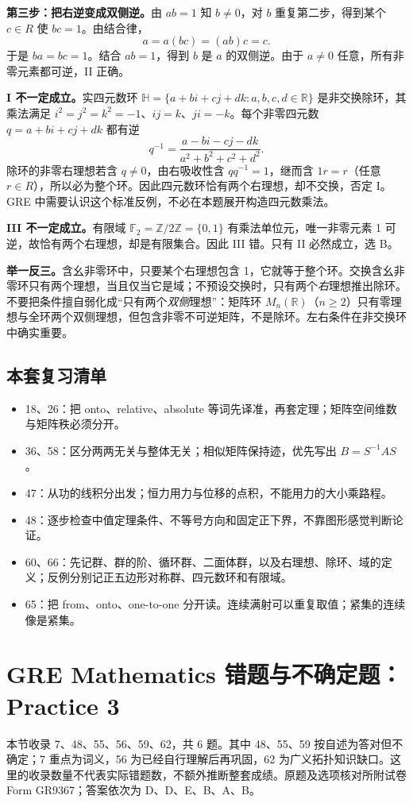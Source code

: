 \documentclass[11pt,a4paper,fontset=fandol]{ctexart}
\begin{document}
\textbf{第三步：把右逆变成双侧逆。}由 $ab=1$ 知 $b\ne0$，对 $b$ 重复第二步，得到某个 $c\in R$ 使 $bc=1$。由结合律，
\[
a=a(bc)=(ab)c=c.
\]
于是 $ba=bc=1$。结合 $ab=1$，得到 $b$ 是 $a$ 的双侧逆。由于 $a\ne0$ 任意，所有非零元素都可逆，II 正确。

\textbf{I 不一定成立。}实四元数环 $\mathbb H=\{a+bi+cj+dk:a,b,c,d\in\mathbb R\}$ 是非交换除环，其乘法满足 $i^2=j^2=k^2=-1$、$ij=k$、$ji=-k$。每个非零四元数 $q=a+bi+cj+dk$ 都有逆
\[
q^{-1}=\frac{a-bi-cj-dk}{a^2+b^2+c^2+d^2}.
\]
除环的非零右理想若含 $q\ne0$，由右吸收性含 $qq^{-1}=1$，继而含 $1r=r$（任意 $r\in R$），所以必为整个环。因此四元数环恰有两个右理想，却不交换，否定 I。GRE 中需要认识这个标准反例，不必在本题展开构造四元数乘法。

\textbf{III 不一定成立。}有限域 $\mathbb F_2=\mathbb Z/2\mathbb Z=\{0,1\}$ 有乘法单位元，唯一非零元素 1 可逆，故恰有两个右理想，却是有限集合。因此 III 错。只有 II 必然成立，选 B。

\textbf{举一反三。}含幺非零环中，只要某个右理想包含 1，它就等于整个环。交换含幺非零环只有两个理想，当且仅当它是域；不预设交换时，只有两个\emph{右}理想推出除环。不要把条件擅自弱化成“只有两个\emph{双侧}理想”：矩阵环 $M_n(\mathbb R)$（$n\ge2$）只有零理想与全环两个双侧理想，但包含非零不可逆矩阵，不是除环。左右条件在非交换环中确实重要。

\subsection{本套复习清单}
\begin{itemize}
\item 18、26：把 onto、relative、absolute 等词先译准，再套定理；矩阵空间维数与矩阵秩必须分开。
\item 36、58：区分两两无关与整体无关；相似矩阵保持迹，优先写出 $B=S^{-1}AS$。
\item 47：从功的线积分出发；恒力用力与位移的点积，不能用力的大小乘路程。
\item 48：逐步检查中值定理条件、不等号方向和固定正下界，不靠图形感觉判断论证。
\item 60、66：先记群、群的阶、循环群、二面体群，以及右理想、除环、域的定义；反例分别记正五边形对称群、四元数环和有限域。
\item 65：把 from、onto、one-to-one 分开读。连续满射可以重复取值；紧集的连续像是紧集。
\end{itemize}
\clearpage
\section{GRE Mathematics 错题与不确定题：Practice 3}
本节收录 7、48、55、56、59、62，共 6 题。其中 48、55、59 按自述为答对但不确定；7 重点为词义，56 为已经自行理解后再巩固，62 为广义拓扑知识缺口。这里的收录数量不代表实际错题数，不额外推断整套成绩。原题及选项核对所附试卷 Form GR9367；答案依次为 D、D、E、B、A、B。
\end{document}
